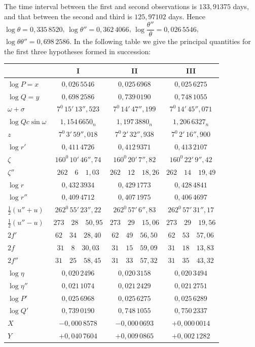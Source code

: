 The time interval between the first and second observations is
$133{,}91375$ days, and that between the second and third is $125{,}97102$ days. Hence $\log\theta = 0{,}335\,8520$,
$\log\theta'' = 0{,}362\,4066$, $\log\dfrac{\theta''}{\theta} = 0{,}026\,5546$, $\log\theta\theta'' = 0{,}698\,2586$. In the following table we give the principal quantities
for the first three hypotheses formed in succession:
\begin{center}\begingroup\footnotesize\setlength{\tabcolsep}{3pt}\renewcommand{\arraystretch}{1.3}
\begin{tabular}{l|c|c|c}
 & I & II & III \\
\hline
$\log P = x$ & $0{,}026\,5546$ & $0{,}025\,6968$ & $0{,}025\,6275$ \\
$\log Q = y$ & $0{,}698\,2586$ & $0{,}739\,0190$ & $0{,}748\,1055$ \\
$\omega + \sigma$ & $7^0\,15'\,13''{,}523$ & $7^0\,14'\,47''{,}199$ & $7^0\,14'\,45''{,}071$ \\
$\log Qc\sin\omega$ & $1{,}154\,6650_n$ & $1{,}197\,3880_n$ & $1{,}206\,6327_n$ \\
$z$ & $7^0\,3'\,59''{,}018$ & $7^0\,2'\,32''{,}938$ & $7^0\,2'\,16''{,}900$ \\
$\log r'$ & $0{,}411\,4726$ & $0{,}412\,9371$ & $0{,}413\,2107$ \\
$\zeta$ & $160^0\,10'\,46''{,}74$ & $160^0\,20'\,7''{,}82$ & $160^0\,22'\,9''{,}42$ \\
$\zeta''$ & $262\quad6\quad1{,}03$ & $262\quad12\quad18{,}26$ & $262\quad14\quad19{,}49$ \\
$\log r$ & $0{,}432\,3934$ & $0{,}429\,1773$ & $0{,}428\,4841$ \\
$\log r''$ & $0{,}409\,4712$ & $0{,}407\,1975$ & $0{,}406\,4697$ \\
$\tfrac12(u''+u)$ & $262^0\,55'\,23''{,}22$ & $262^0\,57'\,6''{,}83$ & $262^0\,57'\,31''{,}17$ \\
$\tfrac12(u''-u)$ & $273\quad28\quad50{,}95$ & $273\quad29\quad15{,}06$ & $273\quad29\quad19{,}56$ \\
$2f'$ & $62\quad34\quad28{,}40$ & $62\quad49\quad56{,}50$ & $62\quad53\quad57{,}06$ \\
$2f$ & $31\quad8\quad30{,}03$ & $31\quad15\quad59{,}09$ & $31\quad18\quad13{,}83$ \\
$2f''$ & $31\quad25\quad58{,}45$ & $31\quad33\quad57{,}32$ & $31\quad35\quad43{,}32$ \\
$\log \eta$ & $0{,}020\,2496$ & $0{,}020\,3158$ & $0{,}020\,3494$ \\
$\log \eta''$ & $0{,}021\,1074$ & $0{,}021\,2429$ & $0{,}021\,2751$ \\
$\log P'$ & $0{,}025\,6968$ & $0{,}025\,6275$ & $0{,}025\,6289$ \\
$\log Q'$ & $0{,}739\,0190$ & $0{,}748\,1055$ & $0{,}750\,2337$ \\
$X$ & $-0{,}000\,8578$ & $-0{,}000\,0693$ & $+0{,}000\,0014$ \\
$Y$ & $+0{,}040\,7604$ & $+0{,}009\,0865$ & $+0{,}002\,1282$ \\
\end{tabular}
\endgroup\end{center}

